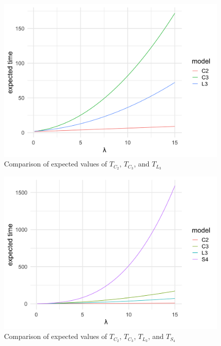 \documentclass{article}
\theoremstyle{plain}
\theoremstyle{definition}
\theoremstyle{remark}
\numberwithin{equation}{section}
\begin{document}
\begin{figure}[h]
  \centering
    \includegraphics[width=.80\textwidth]{figures/ev_phase_comparison_3.png}
   \caption{Comparison of expected values of $T_{C_2}$, $T_{C_3}$, and $T_{L_3}$}
  \label{fig:ev_phase_comparison_3.png}
\end{figure}

\begin{figure}[h]
  \centering
    \includegraphics[width=.80\textwidth]{figures/ev_phase_comparison_4.png}
   \caption{Comparison of expected values of $T_{C_2}$, $T_{C_3}$, $T_{L_3}$, and $T_{S_4}$}
  \label{fig:ev_phase_comparison_4.png}
\end{figure}


\clearpage


\end{document}
